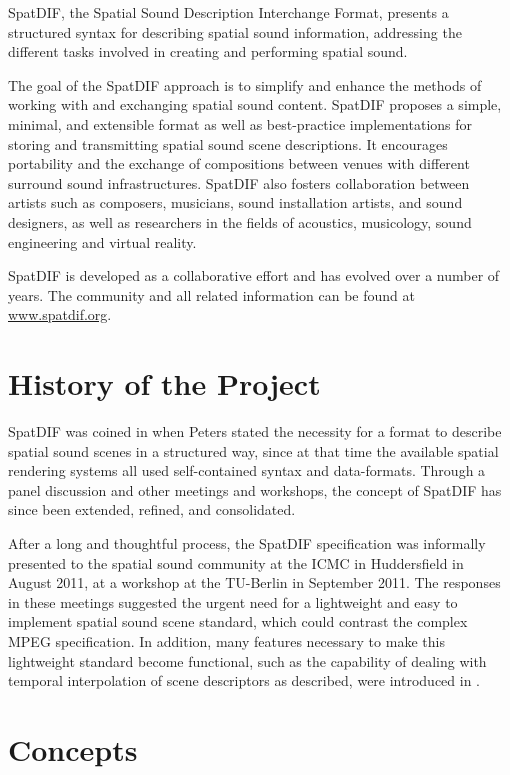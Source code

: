 \documentclass[a4paper]{article}
\begin{document}
SpatDIF, the Spatial Sound Description Interchange Format, presents a structured syntax for describing spatial sound information, addressing the different tasks involved in creating and performing spatial sound.

The goal of the SpatDIF approach is to simplify and enhance the methods of working with and exchanging spatial sound content. 
SpatDIF proposes a simple, minimal, and extensible format as well as best-practice implementations for storing and transmitting spatial sound scene descriptions. 
It encourages portability and the exchange of compositions between venues with different surround sound infrastructures. 
SpatDIF also fosters collaboration between artists such as composers, musicians, sound installation artists, and sound designers, as well as researchers in the fields of acoustics, musicology, sound engineering and virtual reality.

SpatDIF is developed as a collaborative effort and has evolved over a number of years. 
The community and all related information can be found at \url{www.spatdif.org}.

\section{History of the Project} %
SpatDIF was coined in \citeyear{peters_caa07} \cite{peters_caa07} when Peters stated the necessity for a format to describe spatial sound scenes in a structured way, since at that time the available spatial rendering systems all used self-contained syntax and data-formats. 
Through a panel discussion \cite{2008ICMCpanel, Peters:2008spatdif} and other meetings and workshops, the concept of SpatDIF has since been extended, refined, and consolidated. 

After a long and thoughtful process, the SpatDIF specification was informally presented to the spatial sound community at the ICMC in Huddersfield in August 2011, at a workshop at the TU-Berlin in September 2011.
The responses in these meetings suggested the urgent need for a lightweight and easy to implement spatial sound scene standard, which could contrast the complex MPEG specification.
In addition, many features necessary to make this lightweight standard become functional, such as the capability of dealing with temporal interpolation of scene descriptors as described, were introduced in \cite{Peters:2013SpatDifCMJ}.

\section{Concepts}
\end{document}
